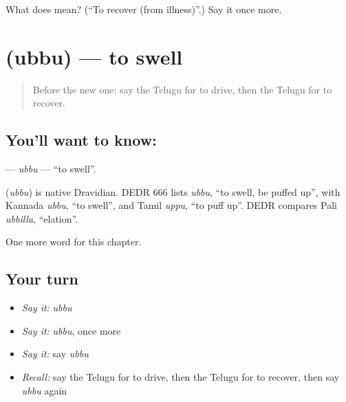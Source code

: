 \begin{tcolorbox}[breakable,colback=teal!4,colframe=teal!35!black,title={Before you move on}]
What does  mean? (\textquotedblleft{}To recover (from illness)\textquotedblright{}.) Say it once more.
\end{tcolorbox}
\section[\texorpdfstring{\te{ఉబ్బు} (ubbu)}{ఉబ్బు (ubbu)}]{ (ubbu) — to swell}

\label{lesson:TE-C279-ubbu}



\begin{quote}
Before the new one: say the Telugu for to drive, then the Telugu for to recover.
\end{quote}

\subsection*{You'll want to know: }
\textbf{} — \emph{ubbu} — \textquotedblleft{}to swell\textquotedblright{}.

\begin{cousinweb}
\textbf{} (\emph{ubbu}) is native Dravidian. DEDR 666 lists \emph{ubbu}, \textquotedblleft{}to swell, be puffed up\textquotedblright{}, with Kannada \emph{ubbu}, \textquotedblleft{}to swell\textquotedblright{}, and Tamil \emph{uppu}, \textquotedblleft{}to puff up\textquotedblright{}. DEDR compares Pali \emph{ubbilla}, \textquotedblleft{}elation\textquotedblright{}.
\end{cousinweb}

\begin{grammarlens}[title={What you've built}]
One more word for this chapter.
\end{grammarlens}

\subsection*{Your turn}
\begin{itemize}
\raggedright
  \item \emph{Say it:} \emph{ubbu}
  \item \emph{Say it:} \emph{ubbu}, once more
  \item \emph{Say it:} say \emph{ubbu}
  \item \emph{Recall:} say the Telugu for to drive, then the Telugu for to recover, then say \emph{ubbu} again
\end{itemize}

